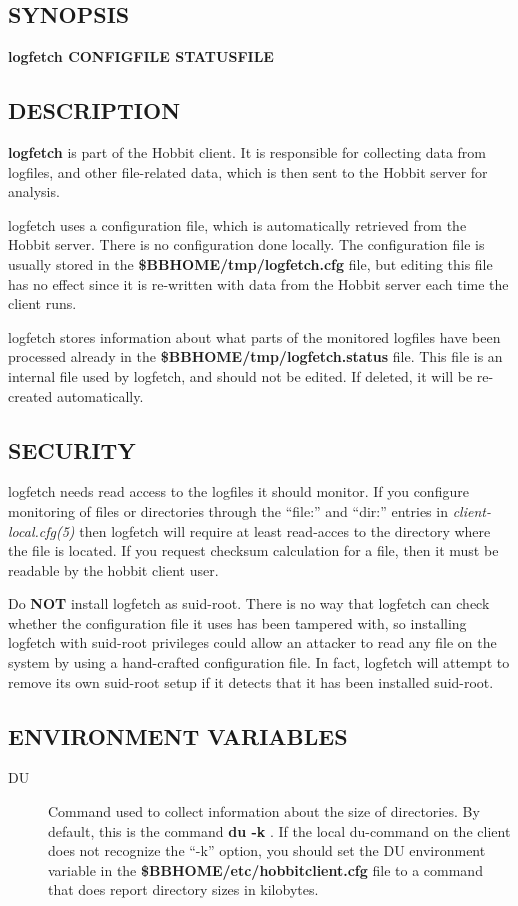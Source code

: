  
\subsection{SYNOPSIS}
\textbf{logfetch CONFIGFILE STATUSFILE}


 
\subsection{DESCRIPTION}
\textbf{logfetch}
 is part of the Hobbit client. It is responsible for collecting data from logfiles, and other file-related data, which is then sent to the Hobbit server for analysis. 

  logfetch uses a configuration file, which is automatically retrieved from the Hobbit server. There is no configuration done locally. The configuration file is usually stored in the \textbf{\$BBHOME/tmp/logfetch.cfg}
 file, but editing this file has no effect since it is re-written with data from the Hobbit server each time the client runs. 


  logfetch stores information about what parts of the monitored logfiles have been processed already in the \textbf{\$BBHOME/tmp/logfetch.status}
 file. This file is an internal file used by logfetch, and should not be edited. If deleted, it will be re-created automatically. 


 
\subsection{SECURITY}
 logfetch needs read access to the logfiles it should monitor. If you configure monitoring of files or directories through the ``file:'' and ``dir:'' entries in \emph{client-local.cfg(5)}
 then logfetch will require at least read-acces to the directory where the file is located. If you request checksum calculation for a file, then it must be readable by the hobbit client user. 

  Do \textbf{NOT}
 install logfetch as suid-root. There is no way that logfetch can check whether the configuration file it uses has been tampered with, so installing logfetch with suid-root privileges could allow an attacker to read any file on the system by using a hand-crafted configuration file. In fact, logfetch will attempt to remove its own suid-root setup if it detects that it has been installed suid-root. 


 
\subsection{ENVIRONMENT VARIABLES}
\begin{description}
\item[DU] Command used to collect information about the size of directories. By default, this is the command \textbf{du -k}
. If the local du-command on the client does not recognize the ``-k'' option, you should set the DU environment variable in the \textbf{\$BBHOME/etc/hobbitclient.cfg}
 file to a command that does report directory sizes in kilobytes. 

 


\end{description}
